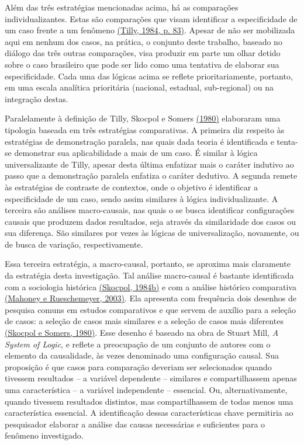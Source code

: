 Além das três estratégias mencionadas acima, há as comparações
individualizantes. Estas são comparações que visam identificar a
especificidade de um caso frente a um fenômeno
\href{https://www.zotero.org/google-docs/?xlNn1l}{(Tilly, 1984, p. 83)}.
Apesar de não ser mobilizada aqui em nenhum dos casos, na prática, o
conjunto deste trabalho, baseado no diálogo das três outras comparações,
visa produzir em parte um olhar detido sobre o caso brasileiro que pode
ser lido como uma tentativa de elaborar sua especificidade. Cada uma das
lógicas acima se reflete prioritariamente, portanto, em uma escala
analítica prioritária (nacional, estadual, sub-regional) ou na
integração destas.

Paralelamente à definição de Tilly, Skocpol e Somers
\href{https://www.zotero.org/google-docs/?rW9s37}{(1980)} elaboraram uma
tipologia baseada em três estratégias comparativas. A primeira diz
respeito às estratégias de demonstração paralela, nas quais dada teoria
é identificada e tenta-se demonstrar sua aplicabilidade a mais de um
caso. É similar à lógica universalizante de Tilly, apesar desta última
enfatizar mais o caráter indutivo ao passo que a demonstração paralela
enfatiza o caráter dedutivo. A segunda remete às estratégias de
contraste de contextos, onde o objetivo é identificar a especificidade
de um caso, sendo assim similares à lógica individualizante. A terceira
são análises macro-causais, nas quais o se busca identificar
configurações causais que produzem dados resultados, seja através da
similaridade dos casos ou sua diferença. São similares por vezes às
lógicas de universalização, novamente, ou de busca de variação,
respectivamente.

Essa terceira estratégia, a macro-causal, portanto, se aproxima mais
claramente da estratégia desta investigação. Tal análise macro-causal é
bastante identificada com a sociologia histórica
\href{https://www.zotero.org/google-docs/?kejRWV}{(Skocpol, 1984b)} e
com a análise histórico comparativa
\href{https://www.zotero.org/google-docs/?OHYcat}{(Mahoney e
Rueschemeyer, 2003)}. Ela apresenta com frequência dois desenhos de
pesquisa comuns em estudos comparativos e que servem de auxílio para a
seleção de casos: a seleção de casos mais similares e a seleção de casos
mais diferentes
\href{https://www.zotero.org/google-docs/?4gjDsF}{(Skocpol e Somers,
1980)}. Esse desenho é baseado na obra de Stuart Mill, \emph{A System of
Logic}, e reflete a preocupação de um conjunto de autores com o elemento
da causalidade, às vezes denominado uma configuração causal. Sua
proposição é que casos para comparação deveriam ser selecionados quando
tivessem resultados -- a variável dependente -- similares e
compartilhassem apenas uma característica -- a variável independente --
essencial. Ou, alternativamente, quando tivessem resultados distintos,
mas compartilhassem de todas menos uma característica essencial. A
identificação dessas características chave permitiria ao pesquisador
elaborar a análise das causas necessárias e suficientes para o fenômeno
investigado.

